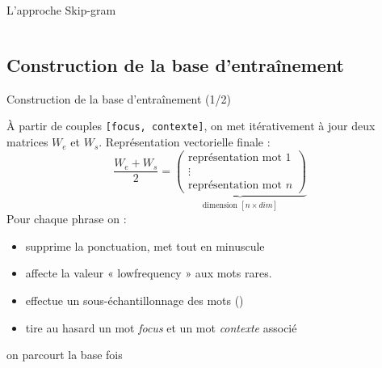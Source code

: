 \documentclass[10pt,xcolor=table,color={dvipsnames,usenames},ignorenonframetext,usepdftitle=false,french]{beamer}
\begin{document}
\begin{frame}{L’approche Skip-gram}
\begin{columns}
\begin{column}{0.4\textwidth}
\end{column}
\end{columns}

\end{frame}

\hypertarget{construction-de-la-base-dentrauxeenement}{%
\subsection{Construction de la base
d’entraînement}\label{construction-de-la-base-dentrauxeenement}}

\begin{frame}[fragile]{Construction de la base d’entraînement (1/2)}
\protect\hypertarget{construction-de-la-base-dentrauxeenement-12}{}

\bcoutil À partir de couples \texttt{{[}focus,\ contexte{]}}, on met
itérativement à jour deux matrices \(W_e\) et \(W_s\). Représentation
vectorielle finale : \[
\frac{W_e+W_s}{2}=\underbrace{
\begin{pmatrix}
\text{représentation mot 1} \\ \vdots
\\
\text{représentation mot }n 
\end{pmatrix}}_{\text{dimension }[n\times dim]}
\] \pause Pour chaque phrase on :

\begin{itemize}
\item
  supprime la ponctuation, met tout en minuscule
\item
  affecte la valeur « lowfrequency » aux mots rares.
\item
  effectue un sous-échantillonnage des mots ()
\item
  tire au hasard un mot \emph{focus} et un mot \emph{contexte} associé
\end{itemize}

\faArrowCircleRight{} on parcourt la base  fois

\end{frame}
\end{document}
